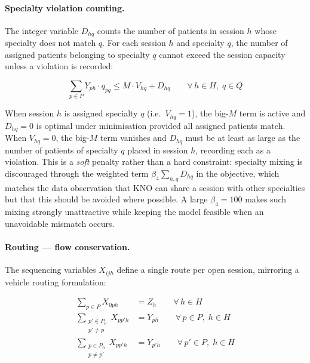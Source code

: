 \paragraph{Specialty violation counting.}

The integer variable $D_{hq}$ counts the number of patients in session $h$
whose specialty does not match $q$. For each session $h$ and specialty $q$,
the number of assigned patients belonging to specialty $q$ cannot exceed the
session capacity unless a violation is recorded:

\begin{equation}
  \sum_{p \in P} Y_{ph} \cdot q_{pq}
  \leq M \cdot V_{hq} + D_{hq}
  \qquad \forall\, h \in H,\; q \in Q
  \label{eq:viol}
\end{equation}

When session $h$ is assigned specialty $q$ (i.e.\ $V_{hq} = 1$), the big-$M$
term is active and $D_{hq} = 0$ is optimal under minimisation provided all
assigned patients match. When $V_{hq} = 0$, the big-$M$ term vanishes and
$D_{hq}$ must be at least as large as the number of patients of specialty $q$
placed in session $h$, recording each as a violation.
This is a \emph{soft} penalty rather than a hard constraint: specialty mixing is
discouraged through the weighted term $\beta_4 \sum_{h,q} D_{hq}$ in the
objective, which matches the data observation that KNO can share a session with
other specialties but that this should be avoided where possible. A large
$\beta_4 = 100$ makes such mixing strongly unattractive while keeping the model
feasible when an unavoidable mismatch occurs.

\paragraph{Routing --- flow conservation.}

The sequencing variables $X_{ijh}$ define a single route per open session,
mirroring a vehicle routing formulation:

\begin{align}
  \sum_{p \in P} X_{0ph} &= Z_h
  \qquad \forall\, h \in H
  \label{eq:depot} \\[2pt]
  \sum_{\substack{p' \in P_0 \\ p' \neq p}} X_{pp'h} &= Y_{ph}
  \qquad \forall\, p \in P,\; h \in H
  \label{eq:flow_out} \\[2pt]
  \sum_{\substack{p \in P_0 \\ p \neq p'}} X_{pp'h} &= Y_{p'h}
  \qquad \forall\, p' \in P,\; h \in H
  \label{eq:flow_in}
\end{align}

